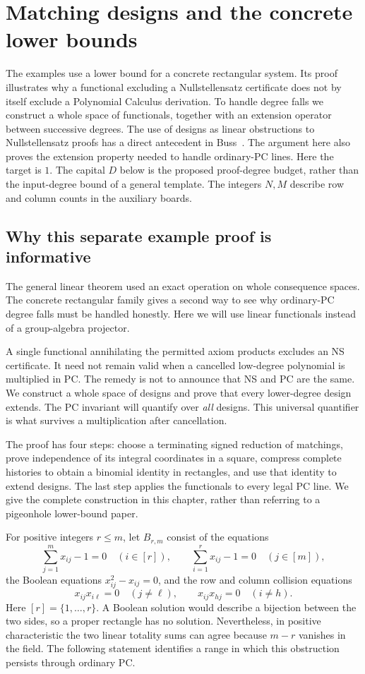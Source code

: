 \chapter{Matching designs and the concrete lower bounds}
\label{tx:app:matching}

The examples use a lower bound for a concrete rectangular system.  Its
proof illustrates why a functional excluding a Nullstellensatz certificate
does not by itself exclude a Polynomial Calculus derivation.  To handle
degree falls we construct a whole space of functionals, together with an
extension operator between successive degrees.
The use of designs as linear obstructions to Nullstellensatz proofs
has a direct antecedent in Buss~\cite{BussDesign}. The argument here
also proves the extension property needed to handle ordinary-PC lines.
Here the target is $1$. The capital $D$ below is the proposed proof-degree
budget, rather than the input-degree bound of a general template.
The integers $N,M$ describe row and column counts in the auxiliary boards.

\section{Why this separate example proof is informative}
The general linear theorem used an exact operation on whole consequence
spaces. The concrete rectangular family gives a second way to see why
ordinary-PC degree falls must be handled honestly. Here we will use
linear functionals instead of a group-algebra projector.

A single functional annihilating the permitted axiom products excludes
an NS certificate. It need not remain valid when a cancelled low-degree
polynomial is multiplied in PC. The remedy is not to announce that NS
and PC are the same. We construct a whole space of designs and prove
that every lower-degree design extends. The PC invariant will quantify
over \emph{all} designs. This universal quantifier is what survives a
multiplication after cancellation.

The proof has four steps: choose a terminating signed reduction of
matchings, prove independence of its integral coordinates in a square,
compress complete histories to obtain a binomial identity in rectangles,
and use that identity to extend designs. The last step applies the
functionals to every legal PC line. We give the complete construction
in this chapter, rather than referring to a pigeonhole lower-bound paper.

For positive integers $r\leq m$, let $B_{r,m}$ consist of the equations
\[
 \sum_{j=1}^{m}x_{ij}-1=0\quad(i\in[r]),\qquad
 \sum_{i=1}^{r}x_{ij}-1=0\quad(j\in[m]),
\]
the Boolean equations $x_{ij}^{2}-x_{ij}=0$, and the row and column
collision equations
\[
 x_{ij}x_{i\ell}=0\quad(j\ne\ell),\qquad
 x_{ij}x_{hj}=0\quad(i\ne h).
\]
Here $[r]=\{1,\ldots,r\}$.  A Boolean solution would describe a bijection
between the two sides, so a proper rectangle has no solution.  Nevertheless,
in positive characteristic the two linear totality sums can agree because
$m-r$ vanishes in the field.  The following statement identifies a range
in which this obstruction persists through ordinary PC.

